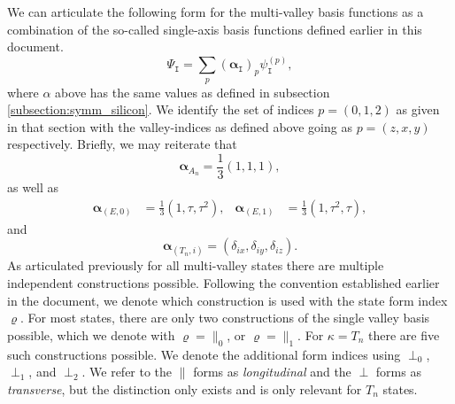 We can articulate the following form for the multi-valley basis functions as a
combination of the so-called single-axis basis functions defined earlier in this
document.
\begin{equation}
\Psi_{\mathtt{I}}
    =
    \sum_{p}
        \left(\bm{\alpha}_{\mathtt{I}}\right)_{p}
        \psi_{\mathtt{I}}^{\left(p\right)}
,
\end{equation}
where $\alpha$ above has the same values as defined in subsection
\ref{subsection:symm_silicon}. We identify the set of indices
$p=\left(0,1,2\right)$ as given in that section with the valley-indices as
defined above going as $p=\left(z,x,y\right)$ respectively. Briefly, we may
reiterate that
\begin{equation}
\bm{\alpha}_{A_{n}}
    =
        \frac{1}{3}\left(1,1,1\right)
,
\end{equation}
as well as
\begin{align}
\bm{\alpha}_{\left(E,0\right)}
    &=
        \frac{1}{3}\left(1,\tau,\tau^{2}\right)
,&
\bm{\alpha}_{\left(E,1\right)}
    &=
        \frac{1}{3}\left(1,\tau^{2},\tau\right)
,
\end{align}
and
\begin{equation}
\bm{\alpha}_{\left(T_{n},i\right)}
    =
        \left(\delta_{ix},\delta_{iy},\delta_{iz}\right)
.
\end{equation}
As articulated previously for all multi-valley states there are multiple
independent constructions possible. Following the convention established earlier
in the document, we denote which construction is used with the state form index
$\varrho$. For most states, there are only two constructions of the single
valley basis possible, which we denote with $\varrho = \parallel_{0}$, or
$\varrho = \parallel_{1}$. For $\kappa = T_{n}$ there are five such
constructions possible. We denote the additional form indices using $\perp_{0}$,
$\perp_{1}$, and $\perp_{2}$. We refer to the $\parallel$ forms as
\emph{longitudinal} and the $\perp$ forms as \emph{transverse}, but the
distinction only exists and is only relevant for $T_{n}$ states.



